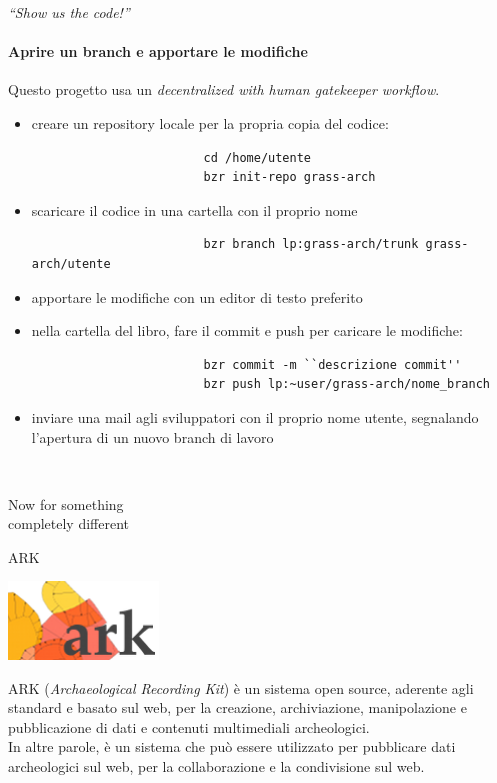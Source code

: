 \documentclass[xcolor=svgnames]{beamer}
\begin{document}
		\begin{frame}[fragile]{\emph{``Show us the code!''}}
			\framesubtitle{Aprire un branch e apportare le modifiche}
			Questo progetto usa un \emph{decentralized with human gatekeeper workflow}.
			\begin{itemize}
				\item creare un repository locale per la propria copia del codice:
					\begin{lstlisting}
						cd /home/utente
						bzr init-repo grass-arch
					\end{lstlisting}
				\item scaricare il codice in una cartella con il proprio nome
					\begin{lstlisting}
						bzr branch lp:grass-arch/trunk grass-arch/utente
					\end{lstlisting}
				\item apportare le modifiche con un editor di testo preferito
				\item nella cartella del libro, fare il commit e push per caricare le modifiche:
					\begin{lstlisting}
						bzr commit -m ``descrizione commit''
						bzr push lp:~user/grass-arch/nome_branch
					\end{lstlisting}
				\item inviare una mail agli sviluppatori con il proprio nome utente, segnalando
					l'apertura di un nuovo branch di lavoro
			\end{itemize}
		\end{frame}


		\begin{frame}{~}
			\begin{center}
				\huge
				Now for something\\completely different
			\end{center}
		\end{frame}


		\begin{frame}{ARK}
			\begin{center}
				\includegraphics[width=0.3\textwidth]{img/logo}
			\end{center}

			ARK (\emph{Archaeological Recording Kit}) è un sistema open source, aderente agli standard e basato sul web, per la creazione, archiviazione, manipolazione e pubblicazione di dati e contenuti multimediali archeologici.\\

			In altre parole, è un sistema che può essere utilizzato per pubblicare dati archeologici sul web, per la collaborazione e la condivisione sul web.
		\end{frame}
\end{document}
